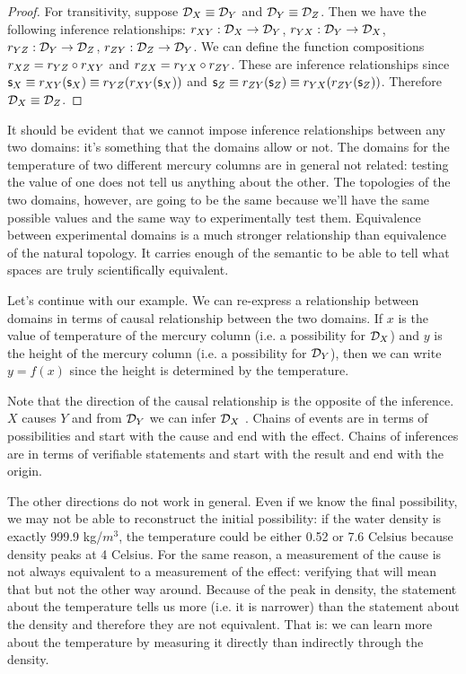 \documentclass[11pt,letterpaper,fleqn]{memoir} %
\begin{document}
\begin{mathSection}
\begin{proof}
		For transitivity, suppose $\mathcal{D}_X \equiv \mathcal{D}_Y$ and $\mathcal{D}_Y \equiv \mathcal{D}_Z$. Then we have the following inference relationships: $r_{XY} : \mathcal{D}_X \to \mathcal{D}_Y$, $r_{YX} : \mathcal{D}_Y \to \mathcal{D}_X$, $r_{YZ} : \mathcal{D}_Y \to \mathcal{D}_Z$, $r_{ZY} : \mathcal{D}_Z \to \mathcal{D}_Y$. We can define the function compositions $r_{XZ} = r_{YZ} \circ r_{XY}$ and $r_{ZX} = r_{YX} \circ r_{ZY}$. These are inference relationships since $\mathsf{s}_X \equiv r_{XY}(\mathsf{s}_X) \equiv r_{YZ}(r_{XY}(\mathsf{s}_X))$ and $\mathsf{s}_Z \equiv r_{ZY}(\mathsf{s}_Z) \equiv r_{YX}(r_{ZY}(\mathsf{s}_Z))$. Therefore $\mathcal{D}_X \equiv \mathcal{D}_Z$.
	\end{proof}
\end{mathSection}


It should be evident that we cannot impose inference relationships between any two domains: it's something that the domains allow or not. The domains for the temperature of two different mercury columns are in general not related: testing the value of one does not tell us anything about the other. The topologies of the two domains, however, are going to be the same because we'll have the same possible values and the same way to experimentally test them. Equivalence between experimental domains is a much stronger relationship than equivalence of the natural topology. It carries enough of the semantic to be able to tell what spaces are truly scientifically equivalent.

Let's continue with our example. We can re-express a relationship between domains in terms of causal relationship between the two domains. If $x$ is the value of temperature of the mercury column (i.e. a possibility for $\mathcal{D}_X$) and $y$ is the height of the mercury column (i.e. a possibility for $\mathcal{D}_Y$), then we can write $y=f(x)$ since the height is determined by the temperature.

Note that the direction of the causal relationship is the opposite of the inference. $X$ causes $Y$ and from $\mathcal{D}_Y$ we can infer $\mathcal{D}_X$ . Chains of events are in terms of possibilities and start with the cause and end with the effect. Chains of inferences are in terms of verifiable statements and start with the result and end with the origin.

The other directions do not work in general. Even if we know the final possibility, we may not be able to reconstruct the initial possibility: if the water density is exactly 999.9 kg/$m^3$, the temperature could be either 0.52 or 7.6 Celsius because density peaks at 4 Celsius. For the same reason, a measurement of the cause is not always equivalent to a measurement of the effect: verifying that  will mean that  but not the other way around. Because of the peak in density, the statement about the temperature tells us more (i.e. it is narrower) than the statement about the density and therefore they are not equivalent. That is: we can learn more about the temperature by measuring it directly than indirectly through the density.
\end{document}
